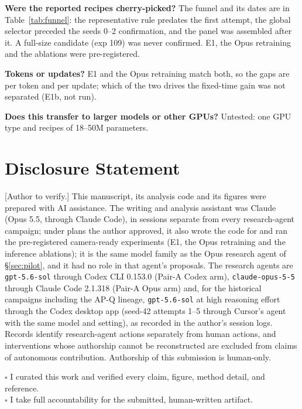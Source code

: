 \documentclass{article}
\newcommand{\authortodo}[1]{{\color{humanframe}[#1]}}
\begin{document}
\textbf{Were the reported recipes cherry-picked?} The funnel and its dates are in Table~\ref{tab:funnel}: the representative rule predates the first attempt, the global selector preceded the seeds 0--2 confirmation, and the panel was assembled after it. A full-size candidate (exp 109) was never confirmed. E1, the Opus retraining and the ablations were pre-registered.

\textbf{Tokens or updates?} E1 and the Opus retraining match both, so the gaps are per token and per update; which of the two drives the fixed-time gain was not separated (E1b, not run).

\textbf{Does this transfer to larger models or other GPUs?} Untested: one GPU type and recipes of 18--50M parameters.

\section{Disclosure Statement}
\authortodo{Author to verify.} This manuscript, its analysis code and its figures were prepared with AI assistance. The writing and analysis assistant was Claude (Opus 5.5, through Claude Code), in sessions separate from every research-agent campaign; under plans the author approved, it also wrote the code for and ran the pre-registered camera-ready experiments (E1, the Opus retraining and the inference ablations); it is the same model family as the Opus research agent of \S\ref{sec:pilot}, and it had no role in that agent's proposals. The research agents are \texttt{gpt-5.6-sol} through Codex CLI 0.153.0 (Pair-A Codex arm), \texttt{claude-opus-5-5} through Claude Code 2.1.318 (Pair-A Opus arm) and, for the historical campaigns including the AP-Q lineage, \texttt{gpt-5.6-sol} at high reasoning effort through the Codex desktop app (seed-42 attempts 1--5 through Cursor's agent with the same model and setting), as recorded in the author's session logs. Records identify research-agent actions separately from human actions, and interventions whose authorship cannot be reconstructed are excluded from claims of autonomous contribution. Authorship of this submission is human-only.

\noindent$\square$ I curated this work and verified every claim, figure, method detail, and reference.\\
$\square$ I take full accountability for the submitted, human-written artifact.

\clearpage


\end{document}
